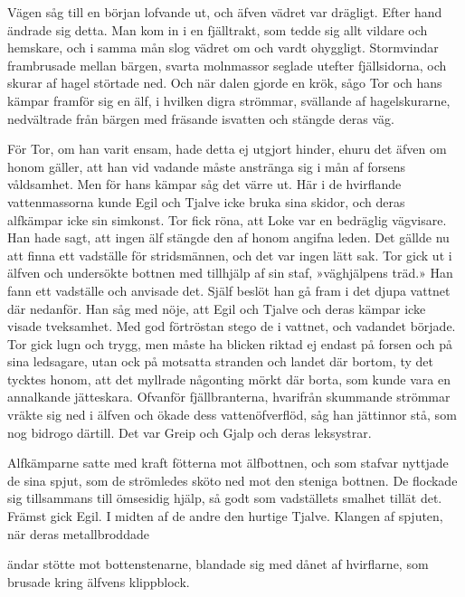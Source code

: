 Vägen såg till en början lofvande ut, och äfven vädret var drägligt.
Efter hand ändrade sig detta. Man kom in i en fjälltrakt, som tedde sig
allt vildare och hemskare, och i samma mån slog vädret om och vardt
ohyggligt.
Stormvindar
frambrusade mellan bärgen, svarta molnmassor seglade utefter
fjällsidorna, och skurar af hagel störtade ned. Och när dalen gjorde en
krök, sågo Tor och hans kämpar framför sig en älf, i hvilken digra
strömmar, svällande af hagelskurarne, nedvältrade från bärgen med
fräsande isvatten och stängde deras väg.

För Tor, om han varit ensam, hade detta ej utgjort hinder, ehuru det
äfven om honom gäller, att han vid vadande måste anstränga sig i mån af
forsens våldsamhet. Men för hans kämpar såg det värre ut. Här i de
hvirflande vattenmassorna kunde Egil och Tjalve icke bruka sina skidor,
och deras alfkämpar icke sin simkonst. Tor fick röna, att Loke var en
bedräglig vägvisare. Han hade sagt, att ingen älf stängde den af honom
angifna leden. Det gällde nu att finna ett vadställe för stridsmännen,
och det var ingen lätt sak. Tor gick ut i älfven och undersökte bottnen
med tillhjälp af sin staf, »väghjälpens träd.» Han fann ett vadställe
och anvisade det. Själf beslöt han gå fram i det djupa vattnet där
nedanför. Han såg med nöje, att Egil och Tjalve och deras kämpar icke
visade tveksamhet. Med god förtröstan stego de i vattnet, och vadandet
började. Tor gick lugn och trygg, men måste ha blicken riktad ej endast
på forsen och på sina ledsagare, utan ock på motsatta stranden och
landet där bortom, ty det tycktes honom, att det myllrade någonting
mörkt där borta, som kunde vara en annalkande jätteskara. Ofvanför
fjällbranterna, hvarifrån skummande strömmar vräkte sig ned i älfven och
ökade dess vattenöfverflöd, såg han jättinnor stå, som nog bidrogo
därtill. Det var Greip och Gjalp och deras leksystrar.

Alfkämparne satte med kraft fötterna mot älfbottnen, och som stafvar
nyttjade de sina spjut, som de strömledes sköto ned mot den steniga
bottnen. De flockade sig tillsammans till ömsesidig hjälp, så godt som
vadställets smalhet tillät det. Främst gick Egil. I midten af de andre
den hurtige Tjalve. Klangen af spjuten, när deras metallbroddade

ändar stötte mot bottenstenarne, blandade sig med dånet af hvirflarne,
som brusade kring älfvens klippblock.

